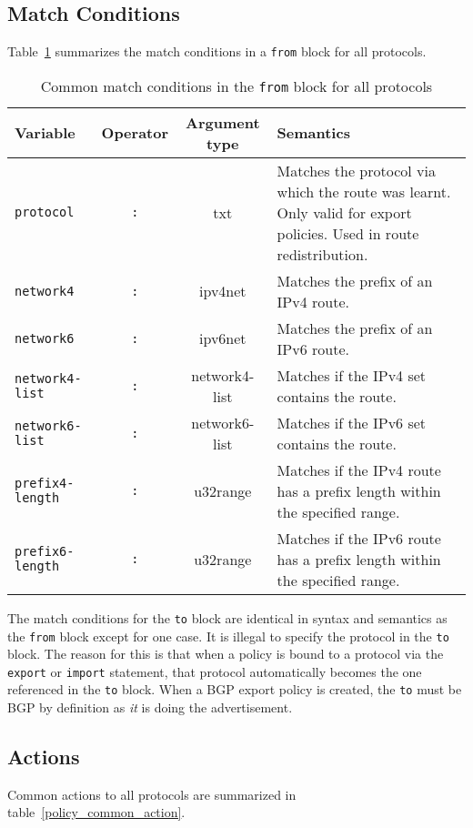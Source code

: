 \subsection{Match Conditions}
Table~\ref{policy_common_match_from} summarizes the match conditions
in a {\tt from} block for all protocols.
\begin{table}[h]
\centering
\begin{tabular}{|l|c|c|p{7.5cm}|}
\hline
Variable & Operator & Argument type & Semantics \\
\hline\hline
{\tt protocol} & {\tt :} & txt & Matches the protocol via which the route was
learnt.  Only valid for export policies.  Used in route redistribution. \\
\hline
{\tt network4} & {\tt :} & ipv4net & Matches the prefix of an IPv4 route. \\
{\tt network6} & {\tt :} & ipv6net & Matches the prefix of an IPv6 route. \\
\hline
{\tt network4-list} & {\tt :} & network4-list & Matches if the IPv4 set contains
the route.\\
{\tt network6-list} & {\tt :} & network6-list & Matches if the IPv6 set contains
the route.\\
\hline
{\tt prefix4-length} & {\tt :} & u32range & Matches if the IPv4 route has a
prefix length within the specified range. \\
{\tt prefix6-length} & {\tt :} & u32range & Matches if the IPv6 route has a
prefix length within the specified range. \\
\hline
\end{tabular}
\caption{\label{policy_common_match_from}Common match conditions in the {\tt from}
block for all protocols}
\end{table}

The match conditions for the {\tt to} block are identical in syntax and
semantics as the {\tt from} block except for one case.  It is illegal to specify
the protocol in the {\tt to} block.  The reason for this is that when a policy
is bound to a protocol via the {\tt export} or {\tt import} statement, that
protocol automatically becomes the one referenced in the {\tt to} block.  When a
BGP export policy is created, the {\tt to} must be BGP by definition as {\em it}
is doing the advertisement.

\subsection{Actions}
Common actions to all protocols are summarized in
table~\ref{policy_common_action}.

